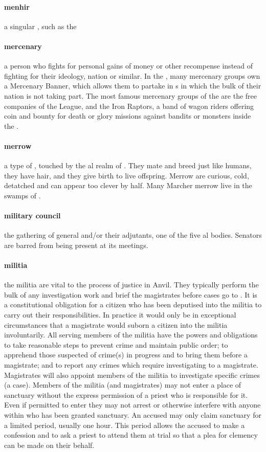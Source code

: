 \paragraph{menhir} a singular , such as the 
\paragraph{mercenary} a person who fights for personal gains of money or other recompense instead of fighting for their ideology, nation or similar. In the , many mercenary groups own a Mercenary Banner, which allows them to partake in s in which the bulk of their nation is not taking part. The most famous mercenary groups of the  are the free companies of the League, and the Iron Raptors, a band of wagon riders offering coin and bounty for death or glory missions against bandits or monsters inside the .
\paragraph{merrow} a type of , touched by the al realm of . They mate and breed just like humans, they have hair, and they give birth to live offspring. Merrow are curious, cold, detatched and can appear too clever by half. Many Marcher merrow live in the swamps of .
\paragraph{military council} the gathering of general and/or their adjutants, one of the five \-al bodies. Senators are barred from being present at its meetings.
\paragraph{militia} the militia are vital to the process of justice in Anvil. They typically perform the bulk of any investigation work and brief the magistrates before cases go to . It is a constitutional obligation for a citizen who has been deputised into the militia to carry out their responsibilities. In practice it would only be in exceptional circumstances that a magistrate would suborn a citizen into the militia involuntarily. All serving members of the militia have the powers and obligations to take reasonable steps to prevent crime and maintain public order; to apprehend those suspected of crime(s) in progress and to bring them before a magistrate; and to report any crimes which require investigating to a magistrate. Magistrates will also appoint members of the militia to investigate specific crimes (a case). Members of the militia (and magistrates) may not enter a place of sanctuary without the express permission of a priest who is responsible for it. Even if permitted to enter they may not arrest or otherwise interfere with anyone within who has been granted sanctuary. An accused may only claim sanctuary for a limited period, usually one hour. This period allows the accused to make a confession and to ask a priest to attend them at trial so that a plea for clemency can be made on their behalf.
